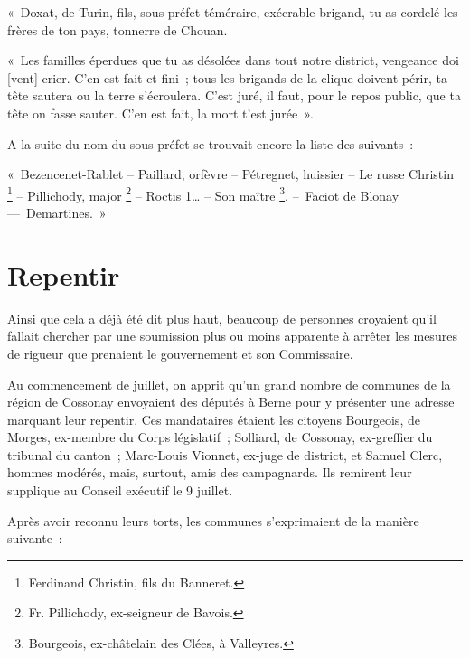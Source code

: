 \documentclass[french,twoside]{book} %
\newenvironment{quoteblock}%
  {\begin{quoting}}
  {\end{quoting}}
\newenvironment{quotebar}{%
    \def\FrameCommand{{\color{rubric!10!}\vrule width 0.5em} \hspace{0.9em}}%
    \def\OuterFrameSep{\itemsep} %
    \MakeFramed {\advance\hsize-\width \FrameRestore}
  }%
  {%
    \endMakeFramed
  }
\renewenvironment{quoteblock}%
  {%
    \savenotes
    \setstretch{0.9}
    \normalfont
    \begin{quotebar}
  }
  {%
    \end{quotebar}
    \spewnotes
  }
\begin{document}
\begin{quoteblock}
 \noindent « Doxat, de Turin, fils, sous-préfet téméraire, exécrable brigand, tu as cordelé les frères de ton pays, tonnerre de Chouan.\par
 « Les familles éperdues que tu as désolées dans tout notre district, vengeance doi [vent] crier. C’en est fait et fini ; tous les brigands de la clique doivent périr, ta tête sautera ou la terre s’écroulera. C’est juré, il faut, pour le repos public, que ta tête on fasse sauter. C’en est fait, la mort t’est jurée ».\par
 A la suite du nom du sous-préfet se trouvait encore la liste des suivants :\par
 « Bezencenet-Rablet – Paillard, orfèvre – Pétregnet, huissier – Le russe Christin \footnote{Ferdinand Christin, fils du Banneret.} – Pillichody, major \footnote{Fr. Pillichody, ex-seigneur de Bavois.} – Roctis 1… – Son maître \footnote{Bourgeois, ex-châtelain des Clées, à Valleyres.}. – Faciot de Blonay — Demartines. »
 \end{quoteblock}

\section[{Repentir}]{Repentir}
\noindent Ainsi que cela a déjà été dit plus haut, beaucoup de personnes croyaient qu’il fallait chercher par une soumission plus ou moins apparente à arrêter les mesures de rigueur que prenaient le gouvernement et son Commissaire.\par
Au commencement de juillet, on apprit qu’un grand nombre de communes de la région de Cossonay envoyaient des députés à Berne pour y présenter une adresse marquant leur repentir. Ces mandataires étaient les citoyens Bourgeois, de Morges, ex-membre du Corps législatif ; Solliard, de Cossonay, ex-greffier du tribunal du canton ; Marc-Louis Vionnet, ex-juge de district, et Samuel Clerc, hommes modérés, mais, surtout, amis des campagnards. Ils remirent leur supplique au Conseil exécutif le 9 juillet.\par
Après avoir reconnu leurs torts, les communes s’exprimaient de la manière suivante :\par
\end{document}
